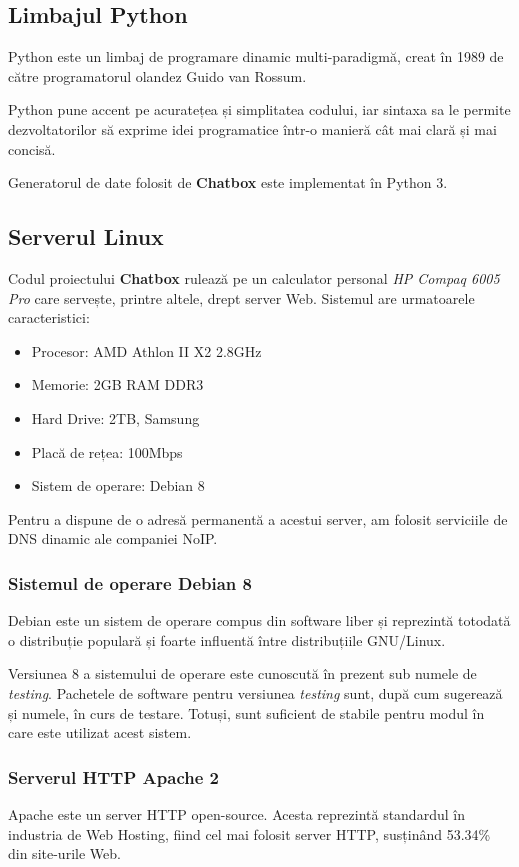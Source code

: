 \documentclass[12pt,a4paper]{article}
\begin{document}
\subsection{Limbajul Python}
Python este un limbaj de programare dinamic multi-paradigmă\cite{python}, creat în 1989 de către programatorul olandez Guido van Rossum\cite{pythonWiki}.

Python pune accent pe acuratețea și simplitatea codului, iar sintaxa sa le permite dezvoltatorilor să exprime idei programatice într-o manieră cât mai clară și mai concisă.

Generatorul de date folosit de \textbf{Chatbox} este implementat în Python 3.

\subsection{Serverul Linux}
Codul proiectului \textbf{Chatbox} rulează pe un calculator personal
 \textit{HP Compaq 6005 Pro}
care servește, printre altele, drept server Web. 
Sistemul are urmatoarele caracteristici:
\begin{itemize}
  \item Procesor: AMD Athlon II X2 2.8GHz
  \item Memorie: 2GB RAM DDR3
  \item Hard Drive: 2TB, Samsung
  \item Placă de rețea: 100Mbps
  \item Sistem de operare: Debian 8
\end{itemize}

Pentru a dispune de o adresă permanentă a acestui server, 
am folosit serviciile de DNS dinamic ale companiei NoIP\cite{noip}.

\subsubsection{Sistemul de operare Debian 8}
Debian\cite{debian} este un sistem de operare compus din software liber\cite{free} și reprezintă totodată o distribuție populară și foarte influentă între distribuțiile GNU/Linux.

Versiunea 8 a sistemului de operare este cunoscută în prezent sub 
numele de \textit{testing}. Pachetele de software pentru versiunea 
\textit{testing} sunt, după cum sugerează și numele, în curs de testare.
Totuși, sunt suficient de stabile pentru modul  în care 
este utilizat acest sistem.

\subsubsection{Serverul HTTP Apache 2}
Apache este un server HTTP open-source. Acesta reprezintă standardul în 
industria de Web Hosting, fiind cel mai folosit server HTTP, susținând 
53.34\% din site-urile Web\cite{apache53}.
\end{document}
